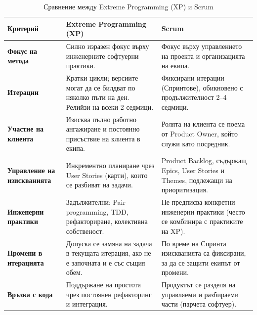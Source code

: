 \documentclass{scrartcl}
\begin{document}
\begin{FlushLeft}
\begin{table}[H]
\caption{Сравнение между Extreme Programming (XP) и Scrum}
\label{tab:xp-vs-scrum}
\small
\begin{tabularx}{\textwidth}{l X X}
\toprule
\textbf{Критерий} & \textbf{Extreme Programming (XP)} & \textbf{Scrum} \\ 
\midrule
\textbf{Фокус на метода} & Силно изразен фокус върху инженерните софтуерни практики. & Фокус върху управлението на проекта и организацията на екипа. \\ \addlinespace
\textbf{Итерации} & Кратки цикли; версиите могат да се билдват по няколко пъти на ден. Релийзи на всеки 2 седмици. & Фиксирани итерации (Спринтове), обикновено с продължителност 2–4 седмици. \\ \addlinespace
\textbf{Участие на клиента} & Изисква пълно работно ангажиране и постоянно присъствие на клиента в екипа. & Ролята на клиента се поема от Product Owner, който служи като посредник. \\ \addlinespace
\textbf{Управление на изискванията} & Инкрементно планиране чрез User Stories (карти), които се разбиват на задачи. & Product Backlog, съдържащ Epics, User Stories и Themes, подлежащи на приоритизация. \\ \addlinespace
\textbf{Инженерни практики} & Задължителни: Pair programming, TDD, рефакториране, колективна собственост. & Не предписва конкретни инженерни практики (често се комбинира с практиките на XP). \\ \addlinespace
\textbf{Промени в итерацията} & Допуска се замяна на задача в текущата итерация, ако не е започната и е със същия обем. & По време на Спринта изискванията са фиксирани, за да се защити екипът от промени. \\ \addlinespace
\textbf{Връзка с кода} & Поддържане на простота чрез постоянен рефакторинг и интеграция. & Продуктът се разделя на управляеми и разбираеми части (парчета софтуер). \\ 
\bottomrule
\end{tabularx}
\end{table}

\end{FlushLeft}
\end{document}
